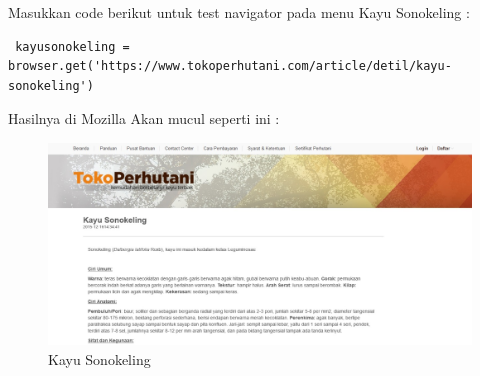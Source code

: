 Masukkan code berikut untuk test navigator pada menu Kayu Sonokeling :
\begin{verbatim}
 kayusonokeling =  browser.get('https://www.tokoperhutani.com/article/detil/kayu-sonokeling')
\end{verbatim}

Hasilnya  di Mozilla Akan mucul seperti ini :
\begin{figure}[h]
\centering
\includegraphics[scale=0.3]{figures/j3}
\caption{Kayu Sonokeling}
\end{figure}